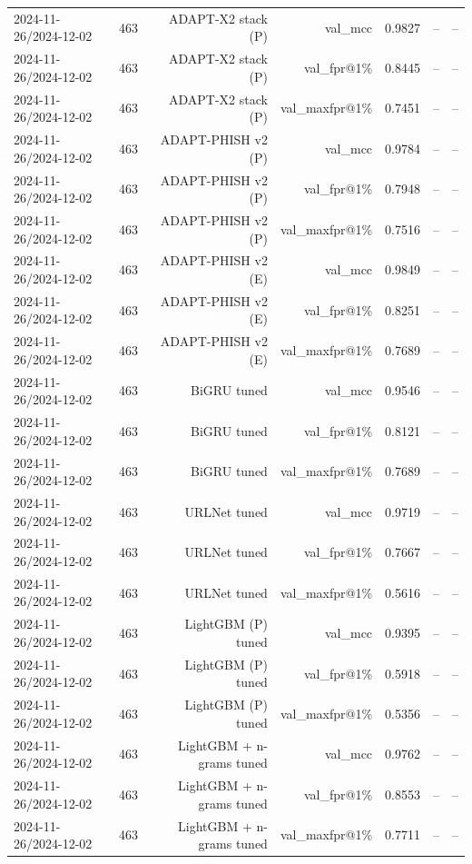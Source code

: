 \begin{table}[t]
\begin{tabular}{llrrrrr}
2024-11-26/2024-12-02 & 463 & ADAPT-X2 stack (P) & val\_mcc & 0.9827 & -- & -- \\
2024-11-26/2024-12-02 & 463 & ADAPT-X2 stack (P) & val\_fpr@1\% & 0.8445 & -- & -- \\
2024-11-26/2024-12-02 & 463 & ADAPT-X2 stack (P) & val\_maxfpr@1\% & 0.7451 & -- & -- \\
2024-11-26/2024-12-02 & 463 & ADAPT-PHISH v2 (P) & val\_mcc & 0.9784 & -- & -- \\
2024-11-26/2024-12-02 & 463 & ADAPT-PHISH v2 (P) & val\_fpr@1\% & 0.7948 & -- & -- \\
2024-11-26/2024-12-02 & 463 & ADAPT-PHISH v2 (P) & val\_maxfpr@1\% & 0.7516 & -- & -- \\
2024-11-26/2024-12-02 & 463 & ADAPT-PHISH v2 (E) & val\_mcc & 0.9849 & -- & -- \\
2024-11-26/2024-12-02 & 463 & ADAPT-PHISH v2 (E) & val\_fpr@1\% & 0.8251 & -- & -- \\
2024-11-26/2024-12-02 & 463 & ADAPT-PHISH v2 (E) & val\_maxfpr@1\% & 0.7689 & -- & -- \\
2024-11-26/2024-12-02 & 463 & BiGRU tuned & val\_mcc & 0.9546 & -- & -- \\
2024-11-26/2024-12-02 & 463 & BiGRU tuned & val\_fpr@1\% & 0.8121 & -- & -- \\
2024-11-26/2024-12-02 & 463 & BiGRU tuned & val\_maxfpr@1\% & 0.7689 & -- & -- \\
2024-11-26/2024-12-02 & 463 & URLNet tuned & val\_mcc & 0.9719 & -- & -- \\
2024-11-26/2024-12-02 & 463 & URLNet tuned & val\_fpr@1\% & 0.7667 & -- & -- \\
2024-11-26/2024-12-02 & 463 & URLNet tuned & val\_maxfpr@1\% & 0.5616 & -- & -- \\
2024-11-26/2024-12-02 & 463 & LightGBM (P) tuned & val\_mcc & 0.9395 & -- & -- \\
2024-11-26/2024-12-02 & 463 & LightGBM (P) tuned & val\_fpr@1\% & 0.5918 & -- & -- \\
2024-11-26/2024-12-02 & 463 & LightGBM (P) tuned & val\_maxfpr@1\% & 0.5356 & -- & -- \\
2024-11-26/2024-12-02 & 463 & LightGBM + n-grams tuned & val\_mcc & 0.9762 & -- & -- \\
2024-11-26/2024-12-02 & 463 & LightGBM + n-grams tuned & val\_fpr@1\% & 0.8553 & -- & -- \\
2024-11-26/2024-12-02 & 463 & LightGBM + n-grams tuned & val\_maxfpr@1\% & 0.7711 & -- & -- \\

\end{tabular}
\end{table}
